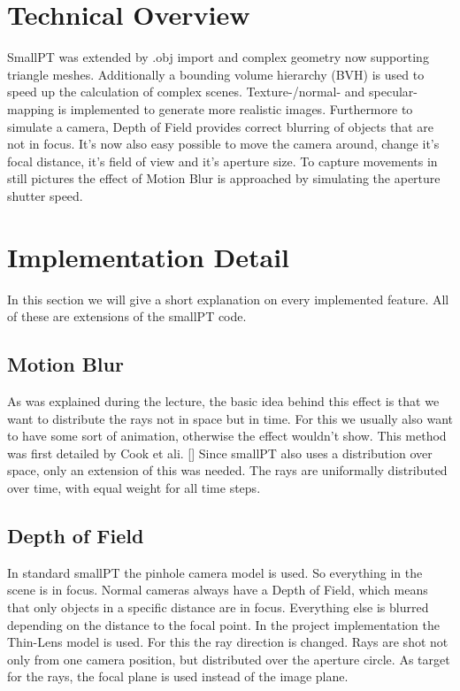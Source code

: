 \documentclass[11pt,a4paper]{article}
\begin{document}
\section{Technical Overview}
SmallPT was extended by .obj import and complex geometry now supporting triangle meshes. Additionally a bounding volume hierarchy (BVH) is used to speed up the calculation of complex scenes. Texture-/normal- and specular-mapping is implemented to generate more realistic images. Furthermore to simulate a camera, Depth of Field provides correct blurring of objects that are not in focus. It's now also easy possible to move the camera around, change it's focal distance, it's field of view and it's aperture size. To capture movements in still pictures the effect of Motion Blur is approached by simulating the aperture shutter speed.

\section{Implementation Detail}
In this section we will give a short explanation on every implemented feature. All of these are extensions of the smallPT code. 

\subsection{Motion Blur}
As was explained during the lecture, the basic idea behind this effect is that we want to distribute the rays not in space but in time. For this we usually also want to have some sort of animation, otherwise the effect wouldn't show. This method was first detailed by Cook et ali. [] 
Since smallPT also uses a distribution over space, only an extension of this was needed.
The rays are uniformally distributed over time, with equal weight for all time steps. 

\subsection{Depth of Field}
In standard smallPT the pinhole camera model is used. So everything in the scene is in focus. Normal cameras always have a Depth of Field, which means that only objects in a specific distance are in focus. Everything else is blurred depending on the distance to the focal point. In the project implementation the Thin-Lens model is used. For this the ray direction is changed. Rays are shot not only from one camera position, but distributed over the aperture circle. As target for the rays, the focal plane is used instead of the image plane. 
\end{document}

